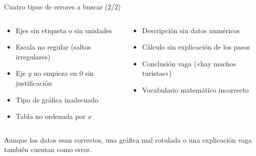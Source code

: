 \documentclass[aspectratio=169, 10pt, spanish]{beamer}
\begin{document}
\begin{frame}{Cuatro tipos de errores a buscar (2/2)}
  \begin{columns}[T]
    \begin{column}{0.48\textwidth}
      \begin{tcolorbox}[enhanced, colback=BComprender!8,
        colframe=BComprender, fonttitle=\bfseries\AlmFontSmall\color{AlmBlanco},
        title={\faChartBar\enskip Errores de representación},
        attach boxed title to top left={yshift=-2.2mm, xshift=4mm},
        boxed title style={colback=BComprender, arc=3pt},
        arc=4pt, leftrule=4pt]
        \AlmFontFootnote
        \begin{itemize}
          \item Ejes sin etiqueta o sin unidades
          \item Escala no regular (saltos irregulares)
          \item Eje $y$ no empieza en 0 sin justificación
          \item Tipo de gráfica inadecuado
          \item Tabla no ordenada por $x$
        \end{itemize}
      \end{tcolorbox}
    \end{column}
    \begin{column}{0.48\textwidth}
      \begin{tcolorbox}[enhanced, colback=BEvaluar!8,
        colframe=BEvaluar, fonttitle=\bfseries\AlmFontSmall\color{AlmBlanco},
        title={\faCommentAlt\enskip Errores de comunicación},
        attach boxed title to top left={yshift=-2.2mm, xshift=4mm},
        boxed title style={colback=BEvaluar, arc=3pt},
        arc=4pt, leftrule=4pt]
        \AlmFontFootnote
        \begin{itemize}
          \item Descripción sin datos numéricos
          \item Cálculo sin explicación de los pasos
          \item Conclusión vaga («hay muchos turistas»)
          \item Vocabulario matemático incorrecto
        \end{itemize}
      \end{tcolorbox}
    \end{column}
  \end{columns}
  \vspace{6pt}
  \begin{notabox}
    \AlmFontFootnote
    Aunque los datos sean correctos, una gráfica mal rotulada
    o una explicación vaga también cuentan como error.
  \end{notabox}
\end{frame}
\end{document}

